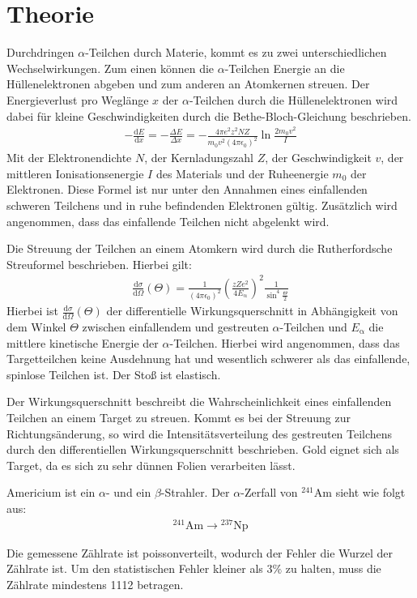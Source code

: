 \section{Theorie}
\label{sec:Theorie}

Durchdringen $\alpha$-Teilchen durch Materie, kommt es zu zwei unterschiedlichen Wechselwirkungen.
Zum einen können die $\alpha$-Teilchen Energie an die Hüllenelektronen abgeben und zum anderen
an Atomkernen streuen. Der Energieverlust pro Weglänge $x$ der $\alpha$-Teilchen durch die Hüllenelektronen wird dabei für
kleine Geschwindigkeiten durch die
Bethe-Bloch-Gleichung beschrieben.
\begin{align}
  -\frac{\mathrm{d}E}{\mathrm{d}x} =-\frac{\Delta E}{\Delta x}= - \frac{4\pi e^2 z^2 N Z}{m_{\mathrm{0}}v^2(4 \pi \epsilon_{\mathrm{0}})^2} \ln{\frac{2 m_{\mathrm{0}} v^2}{I}}
\end{align}
Mit der Elektronendichte $N$, der Kernladungszahl $Z$, der Geschwindigkeit $v$, der mittleren Ionisationsenergie $I$ des Materials
und der Ruheenergie $m_{\mathrm{0}}$ der Elektronen. Diese Formel ist nur unter den Annahmen eines einfallenden
schweren Teilchens und in ruhe befindenden Elektronen gültig. Zusätzlich wird angenommen, dass das einfallende Teilchen nicht
abgelenkt wird.

Die Streuung der Teilchen an einem Atomkern wird durch die Rutherfordsche Streuformel beschrieben. Hierbei gilt:
\begin{align}
  \frac{\mathrm{d}\sigma}{\mathrm{d}\Omega}(\Theta) = \frac{1}{(4 \pi \epsilon_{\mathrm{0}})^2} \left(\frac{z Z e^2}{4 E_{\mathrm{\alpha}}}\right)^2 \frac{1}{\sin^4{\frac{\Theta}{2}}}
  \label{eqn:rutherford}
\end{align}
Hierbei ist $\frac{\mathrm{d}\sigma}{\mathrm{d}\Omega}(\Theta)$ der differentielle Wirkungsquerschnitt in Abhängigkeit von dem Winkel $\Theta$
zwischen einfallendem und gestreuten $\alpha$-Teilchen und
$E_{\mathrm{\alpha}}$ die mittlere kinetische Energie der $\alpha$-Teilchen.
Hierbei wird angenommen, dass das Targetteilchen keine Ausdehnung hat und wesentlich schwerer
als das einfallende, spinlose Teilchen ist. Der Stoß ist elastisch.

Der Wirkungsquerschnitt beschreibt die Wahrscheinlichkeit eines einfallenden Teilchen an
einem Target zu streuen. Kommt es bei der Streuung zur Richtungsänderung, so wird
die Intensitätsverteilung des gestreuten Teilchens durch den differentiellen Wirkungsquerschnitt
beschrieben. Gold eignet sich als Target, da es sich zu sehr dünnen Folien verarbeiten lässt.

Americium ist ein $\alpha$- und ein $\beta$-Strahler. Der $\alpha$-Zerfall von ${}^{241}\mathrm{Am}$ sieht wie folgt aus:
\begin{align*}
  {}^{241}\mathrm{Am} \rightarrow {}^{237}\mathrm{Np}
\end{align*}

Die gemessene Zählrate ist poissonverteilt, wodurch der Fehler die Wurzel der Zählrate ist. Um den
statistischen Fehler kleiner als $3\%$ zu halten, muss die Zählrate mindestens 1112 betragen.
